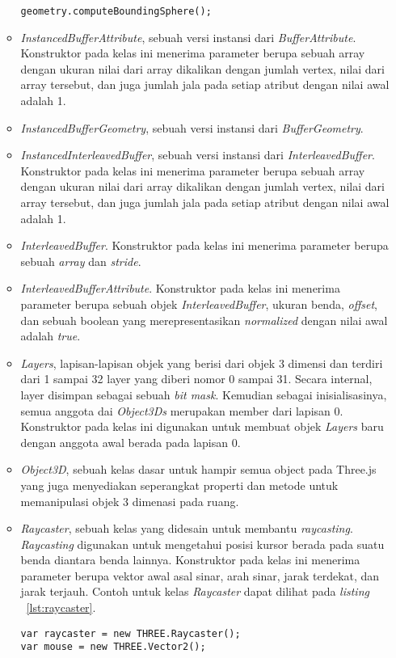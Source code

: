 \begin{itemize}
\begin{itemize}
\begin{lstlisting}[caption={Contoh instansiasi kelas {\it Geometry}.}, label={lst:Geo},captionpos=b]
geometry.computeBoundingSphere();
\end{lstlisting}
		\item{\it InstancedBufferAttribute}, sebuah versi instansi dari {\it BufferAttribute}. Konstruktor pada kelas ini menerima parameter berupa sebuah array dengan ukuran nilai dari array dikalikan dengan jumlah vertex, nilai dari array tersebut, dan juga jumlah jala pada setiap atribut dengan nilai awal adalah 1.
		\item{\it InstancedBufferGeometry}, sebuah versi instansi dari {\it BufferGeometry}.
		\item{\it InstancedInterleavedBuffer}, sebuah versi instansi dari {\it InterleavedBuffer}. Konstruktor pada kelas ini menerima parameter berupa sebuah array dengan ukuran nilai dari array dikalikan dengan jumlah vertex, nilai dari array tersebut, dan juga jumlah jala pada setiap atribut dengan nilai awal adalah 1.
		\item{\it InterleavedBuffer}. Konstruktor pada kelas ini menerima parameter berupa sebuah {\it array} dan {\it stride}.
		\item{\it InterleavedBufferAttribute}. Konstruktor pada kelas ini menerima parameter berupa sebuah objek {\it InterleavedBuffer}, ukuran benda, {\it offset}, dan sebuah boolean yang merepresentasikan {\it normalized} dengan nilai awal adalah {\it true}.
		\item{\it Layers}, lapisan-lapisan objek yang berisi dari objek 3 dimensi dan terdiri dari 1 sampai 32 layer yang diberi nomor 0 sampai 31. Secara internal, layer disimpan sebagai sebuah {\it bit mask}. Kemudian sebagai inisialisasinya, semua anggota dai {\it Object3Ds} merupakan member dari lapisan 0. Konstruktor pada kelas ini digunakan untuk membuat objek {\it Layers} baru dengan anggota awal berada pada lapisan 0.
		\item{\it Object3D}, sebuah kelas dasar untuk hampir semua object pada Three.js yang juga menyediakan seperangkat properti dan metode untuk memanipulasi objek 3 dimenasi pada ruang.
		\item{\it Raycaster}, sebuah kelas yang didesain untuk membantu {\it raycasting}. {\it Raycasting} digunakan untuk mengetahui posisi kursor berada pada suatu benda diantara benda lainnya. Konstruktor pada kelas ini menerima parameter berupa vektor awal asal sinar, arah sinar, jarak terdekat, dan jarak terjauh. Contoh untuk kelas {\it Raycaster} dapat dilihat pada {\it listing} ~\ref{lst:raycaster}.
\begin{lstlisting}[caption={Contoh penggunaan kelas {\it Raycaster}.}, label={lst:raycaster},captionpos=b]
var raycaster = new THREE.Raycaster();
var mouse = new THREE.Vector2();


\end{lstlisting}
\end{itemize}
\end{itemize}
